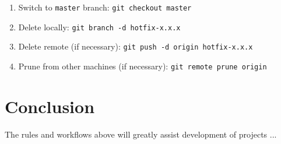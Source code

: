 \documentclass{article}
\begin{document}
\begin{enumerate}
\begin{enumerate}
    \item Switch to \texttt{master} branch: \texttt{git checkout master}

    \item Delete locally: \texttt{git branch -d hotfix-x.x.x}

    \item Delete remote (if necessary): \texttt{git push -d origin hotfix-x.x.x} 

	\item Prune from other machines (if necessary): \texttt{git remote prune origin} 

  \end{enumerate}
  

\end{enumerate}


\section{Conclusion} 
\label{sec:conclusion}

The rules and workflows above will greatly assist development of projects ...








\end{document}
